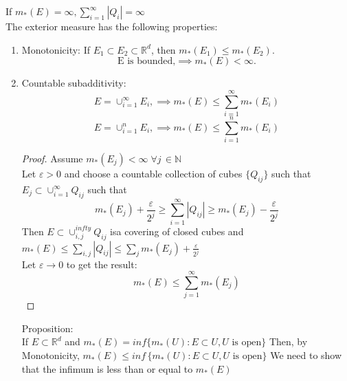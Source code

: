 \documentclass{article}[12 pt]
\begin{document}
If $m_{*}(E) = \infty, \sum_{i=1}^{\infty}|Q_i| = \infty$\\
The exterior measure has the following properties:
\begin{enumerate}
	\item Monotonicity: If $E_1 \subset E_2 \subset \mathbb{R}^d$, then $m_{*}(E_1) \leq m_{*}(E_2)$. \\
	      \begin{equation}
		      \text{E is bounded,} \implies m_{*}(E) < \infty.
	      \end{equation}
	\item Countable subadditivity:
	      \begin{equation}
		      E = \cup_{i=1}^{\infty}E_i, \implies m_{*}(E) \leq \sum_{i=1}^{\infty}m_{*}(E_i)
	      \end{equation}
	      \begin{equation}
		      E = \cup_{i=1}^{n}E_i, \implies m_{*}(E) \leq \sum_{i=1}^{n}m_{*}(E_i)
	      \end{equation}
	      \begin{proof}
		      Assume $m_{*}(E_j) < \infty\; \forall j\,\in\mathbb{N}$\\
		      Let $\varepsilon > 0$ and choose a countable collection of cubes $\{Q_{ij}\}$ such that $E_j \subset \cup_{i=1}^{\infty}Q_{ij}$ such that
		      \begin{equation}
			      m_{*}(E_j) + \frac{\varepsilon}{2^j} \geq \sum_{i=1}^{\infty}|Q_{ij}| \geq m_{*}(E_j) - \frac{\varepsilon}{2^j}
		      \end{equation}
		      Then $E \subset \cup_{i,j}^{infty}Q_{ij}$ isa  covering of closed cubes and $m_{*}(E) \leq \sum_{i,j}|Q_{ij}| \leq \sum_{j}m_{*}(E_j) + \frac{\varepsilon}{2^j}$\\
		      Let $\varepsilon \to 0$ to get the result:
		      \begin{equation}
			      m_{*}(E) \leq \sum_{j=1}^{\infty}m_{*}(E_j)
		      \end{equation}
	      \end{proof}

	      Proposition: \\
	      If $E \subset \mathbb{R}^d$ and $m_{*}(E) = inf\{m_{*}(U) : E \subset U, U \text{ is open}\}$
	      Then, by Monotonicity, $m_{*}(E) \leq inf\, \{m_{*}(U) : E \subset U, U \text{ is open}\}$
	      We need to show that the infimum is less than or equal to $m_{*}(E)$


\end{enumerate}
\end{document}
